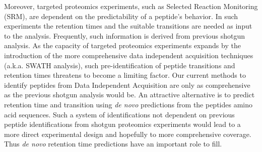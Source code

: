 \documentclass[a4paper]{article}
\begin{document}
Moreover, targeted proteomics experiments, such as Selected Reaction
Monitoring (SRM), are dependent on the predictability of a
peptide's behavior. In such experiments the retention times and the
suitable transitions are needed as input to the analysis. Frequently,
such information is derived from previous shotgun analysis. As the
capacity of targeted proteomics experiments expands by the
introduction of the more comprehensive data independent acquisition
techniques \cite{Venable2004} (a.k.a. SWATH analysis), such
pre-identification of peptide transitions and retention times
threatens to become a limiting factor. Our current methods to identify
peptides from Data Independent Acquisition are only as comprehensive as the previous shotgun
analysis would be. An attractive alternative is to predict retention
time and transition using {\em de novo} predictions from the peptides
amino acid sequences.  Such a system of identifications not dependent
on previous peptide identifications from shotgun proteomics experiments
would lead to a more direct experimental design and hopefully to more
comprehensive coverage. Thus {\em de novo} retention time predictions
have an important role to fill.




\end{document}
